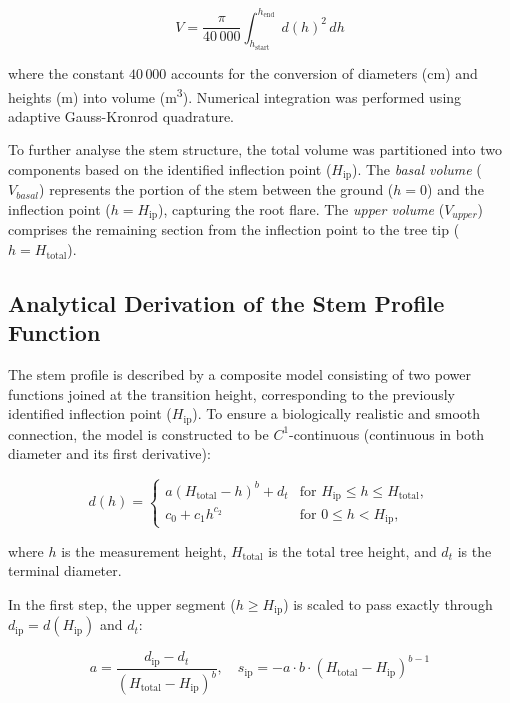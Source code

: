 \documentclass[twocolumn, bibliography=totoc]{scrartcl}
\begin{document}
\begin{equation}
  V = \frac{\pi}{40\,000} \int_{h_{\text{start}}}^{h_{\text{end}}} d(h)^2 \, dh
\end{equation}

where the constant $40\,000$ accounts for the conversion of diameters (\unit{cm}) and heights (\unit{m}) into volume (\unit{m^3}). Numerical integration was performed using adaptive Gauss-Kronrod quadrature.

To further analyse the stem structure, the total volume was partitioned into two components based on the identified inflection point ($H_{\text{ip}}$). The \emph{basal volume} ($V_{basal}$) represents the portion of the stem between the ground ($h = 0$) and the inflection point ($h = H_{\text{ip}}$), capturing the root flare. The \emph{upper volume} ($V_{upper}$) comprises the remaining section from the inflection point to the tree tip ($h = H_{\text{total}}$).


\subsection{Analytical Derivation of the Stem Profile Function}

The stem profile is described by a composite model consisting of two power functions joined at the transition height, corresponding to the previously identified inflection point ($H_{\text{ip}}$). To ensure a biologically realistic and smooth connection, the model is constructed to be $C^1$-continuous (continuous in both diameter and its first derivative):

\begin{equation}
d(h) = 
\begin{cases} 
a(H_{\text{total}} - h)^b + d_t & \text{for } H_{\text{ip}} \le h \le H_{\text{total}}, \\
c_0 + c_1 h^{c_2} & \text{for } 0 \le h < H_{\text{ip}}, 
\end{cases}
\end{equation}

where $h$ is the measurement height, $H_{\text{total}}$ is the total tree height, and $d_t$ is the terminal diameter.

In the first step, the upper segment ($h \ge H_{\text{ip}}$) is scaled to pass exactly through $d_{\text{ip}} = d(H_{\text{ip}})$ and $d_t$:

\begin{equation}
a = \frac{d_{\text{ip}} - d_t}{(H_{\text{total}} - H_{\text{ip}})^b}, \quad
s_{\text{ip}} = -a \cdot b \cdot (H_{\text{total}} - H_{\text{ip}})^{b-1}
\end{equation}
\end{document}
